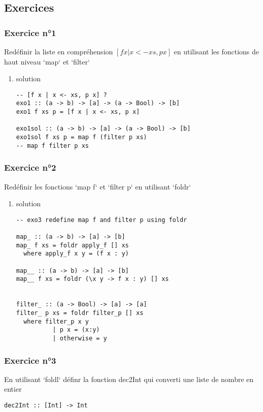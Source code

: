 \documentclass[11pt]{article}
\begin{document}
\subsection{Exercices}
\label{sec:orgb68e5a1}

\subsubsection{Exercice n°1}
\label{sec:org8f0baaa}
Redéfinir la liste en compréhension \([f x | x <- xs, p x]\) en utilisant les fonctions de haut niveau `map` et `filter`
\begin{enumerate}
\item solution
\label{sec:orgbc95fa3}
\begin{verbatim}
-- [f x | x <- xs, p x] ?
exo1 :: (a -> b) -> [a] -> (a -> Bool) -> [b]
exo1 f xs p = [f x | x <- xs, p x]

exo1sol :: (a -> b) -> [a] -> (a -> Bool) -> [b]
exo1sol f xs p = map f (filter p xs)
-- map f filter p xs
\end{verbatim}
\end{enumerate}

\subsubsection{Exercice n°2}
\label{sec:org8f5f78c}
Redéfinir les fonctions `map f` et `filter p` en utilisant `foldr`

\begin{enumerate}
\item solution
\label{sec:org638f2fb}

\begin{verbatim}
-- exo3 redefine map f and filter p using foldr

map_ :: (a -> b) -> [a] -> [b]
map_ f xs = foldr apply_f [] xs
  where apply_f x y = (f x : y)

map__ :: (a -> b) -> [a] -> [b]
map__ f xs = foldr (\x y -> f x : y) [] xs


filter_ :: (a -> Bool) -> [a] -> [a]
filter_ p xs = foldr filter_p [] xs
  where filter_p x y
          | p x = (x:y)
          | otherwise = y
\end{verbatim}
\end{enumerate}

\subsubsection{Exercice n°3}
\label{sec:orgc201381}
En utilisant `foldl` définr la fonction dec2Int
qui converti une liste de nombre en entier
\begin{verbatim}
dec2Int :: [Int] -> Int
\end{verbatim}
\end{document}
